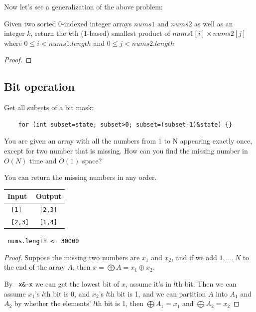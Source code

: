 \documentclass[11pt]{article}
\let\OldTexttt\texttt
\renewcommand{\texttt}[1]{\OldTexttt{\color{MidnightBlue} #1}}
\begin{document}
Now let's see a generalization of the above problem:

\begin{problem}
Given two sorted 0-indexed integer arrays \(nums1\) and \(nums2\) as well as an integer \(k\), return the
\(k\)th (1-based) smallest product of \(nums1[i]\times nums2[j]\) where \(0\le i < nums1.length\) and
\(0\le j<nums2.length\)
\end{problem}

\begin{proof}

\end{proof}



\subsection{Bit operation}
\label{sec:org6368b30}
Get all subsets of a bit mask:
\begin{verbatim}
    for (int subset=state; subset>0; subset=(subset-1)&state) {}
\end{verbatim}

\begin{problem}
You are given an array with all the numbers from 1 to N appearing exactly once, except for two
number that is missing. How can you find the missing number in \(O(N)\) time and \(O(1)\) space?

You can return the missing numbers in any order.

\begin{center}
\begin{tabular}{ll}
Input & Output\\
\hline
\texttt{[1]} & \texttt{[2,3]}\\
\texttt{[2,3]} & \texttt{[1,4]}\\
\end{tabular}
\end{center}


\texttt{nums.length <= 30000}
\end{problem}

\begin{proof}
Suppose the missing two numbers are \(x_1\) and \(x_2\), and if we add \(1,\dots,N\) to the end of the
array \(A\), then \(x=\bigoplus A=x_1\oplus x_2\).

By \texttt{x\&-x} we can get the lowest bit of \(x\), assume it's in \(l\)th bit. Then we can
assume \(x_1\)'s \(l\)th bit is 0, and \(x_2\)'s \(l\)th bit is 1, and we can partition \(A\) into
\(A_1\) and \(A_2\) by whether the elements' \(l\)th bit is 1, then \(\bigoplus A_1=x_1\) and \(\bigoplus A_2=x_2\)
\end{proof}
\end{document}
